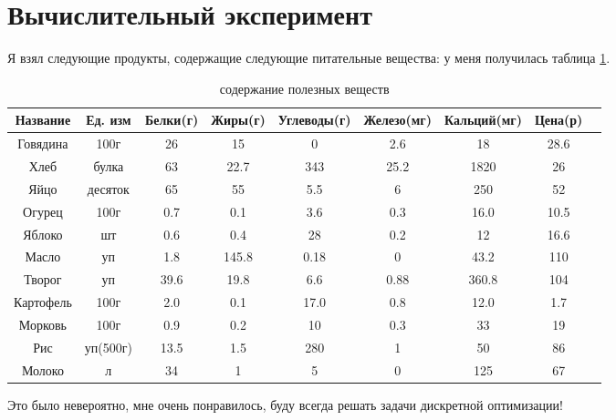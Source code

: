 \documentclass[]{article}
\begin{document}
\section{Вычислительный эксперимент}
Я взял следующие продукты, содержащие следующие питательные вещества:
у меня получилась таблица \ref{tab:1}.
\begin{table}\caption{содержание полезных веществ}\label{tab:1}
\centering
\begin{tabular}{|c|c|c|c|c|c|c|c|c|}
\hline
Название & Ед. изм & Белки(г) & Жиры(г) & Углеводы(г) & Железо(мг) & Кальций(мг) & Цена(р)\\
\hline
Говядина & 100г & 26 & 15 & 0 & 2.6 & 18 & 28.6\\
\hline
Хлеб & булка & 63 & 22.7& 343 & 25.2 & 1820 & 26\\
\hline
Яйцо & десяток & 65 & 55 & 5.5 & 6 & 250 & 52\\
\hline
Огурец & 100г & 0.7 & 0.1 & 3.6 & 0.3 & 16.0 & 10.5\\
\hline
Яблоко & шт & 0.6 & 0.4 & 28 & 0.2 & 12 & 16.6\\
\hline
Масло & уп & 1.8 & 145.8 & 0.18 & 0 & 43.2 & 110\\
\hline
Творог & уп & 39.6 & 19.8 & 6.6 & 0.88 & 360.8 & 104\\
\hline
Картофель & 100г & 2.0 & 0.1 & 17.0 & 0.8 & 12.0 & 1.7\\
\hline
Морковь & 100г & 0.9 & 0.2 & 10 & 0.3 & 33 & 19\\
\hline
Рис & уп(500г) & 13.5 & 1.5 & 280 & 1 & 50 &86\\
\hline
Молоко & л & 34 & 1 & 5 & 0 &125 & 67\\
\hline
\end{tabular}
\end{table}


Это было невероятно, мне очень понравилось, буду всегда решать задачи дискретной оптимизации!
\end{document}
